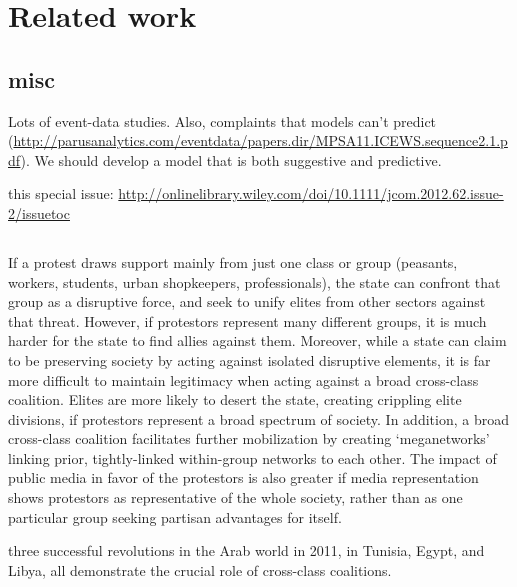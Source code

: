 \section{Related work}

\subsection{misc}


Lots of event-data studies. Also, complaints that models can't predict (\url{http://parusanalytics.com/eventdata/papers.dir/MPSA11.ICEWS.sequence2.1.pdf}).  We should develop a model that is both suggestive and predictive.  

this special issue: \url{http://onlinelibrary.wiley.com/doi/10.1111/jcom.2012.62.issue-2/issuetoc}

\subsection{\citep{mishra_enthusiasm_2014}}

\subsection{\citep{goldstone_cross-class_2011}}
If a protest draws support mainly from just one class or group (peasants, workers,
students, urban shopkeepers, professionals), the state can confront that group as a disruptive
force, and seek to unify elites from other sectors against that threat. However, if
protestors represent many different groups, it is much harder for the state to find allies
against them. Moreover, while a state can claim to be preserving society by acting
against isolated disruptive elements, it is far more difficult to maintain legitimacy when
acting against a broad cross-class coalition. Elites are more likely to desert the state, creating
crippling elite divisions, if protestors represent a broad spectrum of society. In
addition, a broad cross-class coalition facilitates further mobilization by creating ‘meganetworks’
linking prior, tightly-linked within-group networks to each other. The impact
of public media in favor of the protestors is also greater if media representation shows
protestors as representative of the whole society, rather than as one particular group
seeking partisan advantages for itself.

three successful revolutions in the Arab world in 2011, in Tunisia, Egypt, and Libya,
all demonstrate the crucial role of cross-class coalitions.

